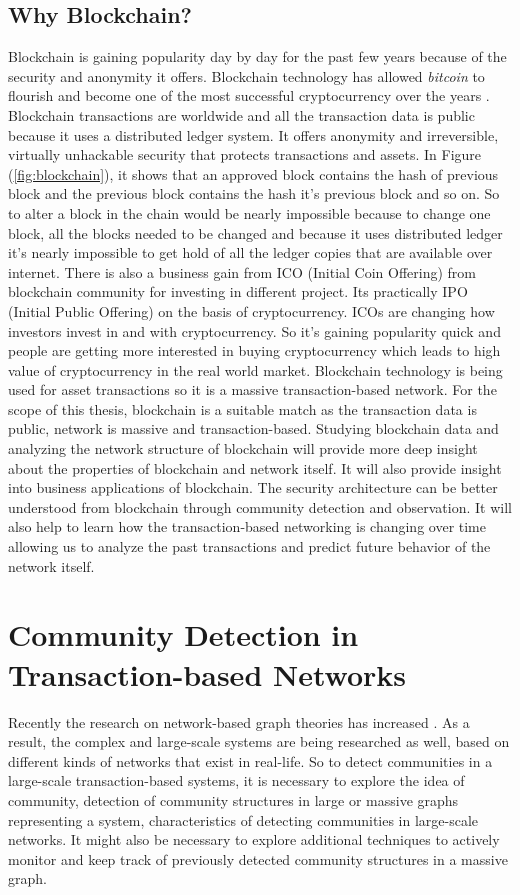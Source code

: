 \subsection{Why Blockchain?}
Blockchain is gaining popularity day by day for the past few years because of the security and anonymity it offers. Blockchain technology has allowed \textit{bitcoin} to flourish and become one of the most successful cryptocurrency over the years \cite{ref-41}. Blockchain transactions are worldwide and all the transaction data is public because it uses a distributed ledger system. It offers anonymity and irreversible, virtually unhackable security that protects transactions and assets. In Figure (\ref{fig:blockchain}), it shows that an approved block contains the hash of previous block and the previous block contains the hash it's previous block and so on. So to alter a block in the chain would be nearly impossible because to change one block, all the blocks needed to be changed and because it uses distributed ledger it's nearly impossible to get hold of all the ledger copies that are available over internet. There is also a business gain from ICO (Initial Coin Offering) from blockchain community for investing in different project. Its practically IPO (Initial Public Offering) on the basis of cryptocurrency. ICOs are changing how investors invest in and with cryptocurrency. So it's gaining popularity quick and people are getting more interested in buying cryptocurrency which leads to high value of cryptocurrency in the real world market. Blockchain technology is being used for asset transactions so it is a massive transaction-based network. For the scope of this thesis, blockchain is a suitable match as the transaction data is public, network is massive and transaction-based. Studying blockchain data and analyzing the network structure of blockchain will provide more deep insight about the properties of blockchain and network itself. It will also provide insight into business applications of blockchain. The security architecture can be better understood from blockchain through community detection and observation. It will also help to learn how the transaction-based networking is changing over time allowing us to analyze the past transactions and predict future behavior of the network itself.

\section{Community Detection in Transaction-based Networks}
Recently the research on network-based graph theories has increased \cite{ref-1}. As a result, the complex and large-scale systems are being researched as well, based on different kinds of networks that exist in real-life. So to detect communities in a large-scale transaction-based systems, it is necessary to explore the idea of community, detection of community structures in large or massive graphs representing a system, characteristics of detecting communities in large-scale networks. It might also be necessary to explore additional techniques to actively monitor and keep track of previously detected community structures in a massive graph.

